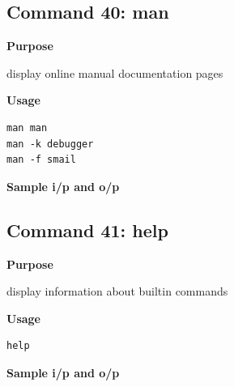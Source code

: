 \documentclass{article}
\begin{document}
\subsection{Command 40: man} 
\textbf{Purpose}
\begin{flushleft}
 display online manual documentation pages
\end{flushleft}
\textbf{Usage}
\begin{verbatim}
man man
man -k debugger
man -f smail
\end{verbatim}
\textbf{Sample i/p and o/p}
\begin{figure}[H] 
\end{figure}
\subsection{Command 41: help} 
\textbf{Purpose}
\begin{flushleft}
display information about builtin commands
\end{flushleft}
\textbf{Usage}
\begin{verbatim}
help
\end{verbatim}
\textbf{Sample i/p and o/p}
\begin{figure}[H] 
\end{figure}
\end{document}

